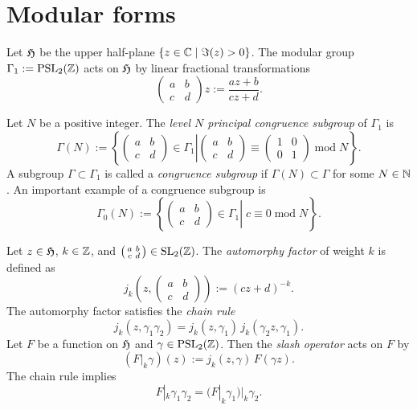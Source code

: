   \section{Modular forms}
  Let $\mathfrak{H}$ be the upper half-plane $\{z\in\mathbb{C}\mid\Im(z)>0\}$. The modular group $\Gamma_1:=\mathrm{PSL}_2(\mathbb{Z})$ acts on $\mathfrak{H}$ by linear fractional transformations
  $$\left(\begin{smallmatrix}a&b\\c&d\end{smallmatrix}\right)z:=\frac{az+b}{cz+d}.$$

  Let $N$ be a positive integer. The \emph{level $N$ principal congruence subgroup} of $\Gamma_1$ is
  $$\Gamma(N):=\left\{\left.\left(\begin{smallmatrix}a&b\\c&d\end{smallmatrix}\right)\in\Gamma_1\right|\left(\begin{smallmatrix}a&b\\c&d\end{smallmatrix}\right)\equiv\left(\begin{smallmatrix}1&0\\0&1\end{smallmatrix}\right)\;\mathrm{mod}\;N\right\}.$$
  A subgroup $\Gamma\subset\Gamma_1$ is called a \emph{congruence subgroup} if $\Gamma(N)\subset\Gamma$ for some $N\in\mathbb{N}$. An important example of a congruence subgroup is
  $$\Gamma_0(N):=\left\{\left.\left(\begin{smallmatrix}a&b\\c&d\end{smallmatrix}\right)\in\Gamma_1\right|\;c\equiv0\;\mathrm{mod}\;N\right\}.$$

  Let $z\in\mathfrak{H}$, $k\in\mathbb{Z}$, and $\left(\begin{smallmatrix}a&b\\c&d\end{smallmatrix}\right)\in\mathrm{SL}_2(\mathbb{Z})$. The \emph{automorphy factor} of weight $k$ is defined as
  $$j_k(z,\left(\begin{smallmatrix}a&b\\c&d\end{smallmatrix}\right)):=(cz+d)^{-k}.$$
  The automorphy factor satisfies the \emph{chain rule}
  $$j_k(z,\gamma_1\gamma_2)=j_k(z,\gamma_1)\,j_k(\gamma_2z,\gamma_1). $$
  Let $F$ be a  function on $\mathfrak{H}$ and $\gamma\in\mathrm{PSL}_2(\mathbb{Z})$. Then the \emph{slash operator} acts on $F$ by
  $$(F|_k\gamma)(z):=j_k(z,\gamma)\,F(\gamma z). $$
  The chain rule implies
  $$F|_k\gamma_1\gamma_2=(F|_k\gamma_1)|_k\gamma_2.$$

